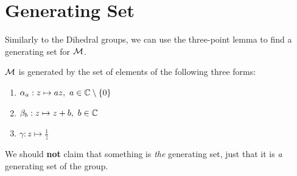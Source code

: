 \documentclass[../main.tex]{subfiles}
\begin{document}
\section{Generating Set}
Similarly to the Dihedral groups, we can use the three-point lemma to find a generating set for $\mathcal{M}$.
\begin{proposition}
  $\mathcal{M}$ is generated by the set of elements of the following three forms: \label{mobGenerators}
  \begin{enumerate}
    \item $\alpha_a : z \mapsto az,\ a \in \mathbb{C} \setminus \{0\}$
    \item $\beta_b: z \mapsto z + b,\ b \in \mathbb{C}$
    \item $\gamma: z \mapsto \frac{1}{z}$
  \end{enumerate}
\end{proposition}
\begin{remark}
  We should \textbf{not} claim that something is \textit{the} generating set, just that it is \textit{a} generating set of the group.
\end{remark}
\end{document}
